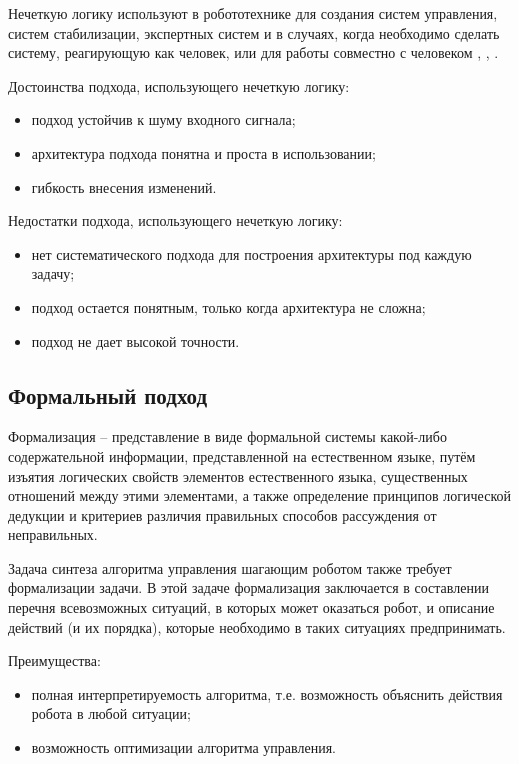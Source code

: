 Нечеткую логику используют в робототехнике для создания систем управления, систем стабилизации, экспертных систем и в случаях, когда необходимо сделать систему, реагирующую как человек, или для работы совместно с человеком \cite{fuzzy1}, \cite{fuzzy2}, \cite{fuzzy3}.

Достоинства подхода, использующего нечеткую логику:
\begin{itemize}
	\item подход устойчив к шуму входного сигнала;
	\item архитектура подхода понятна и проста в использовании;
	\item гибкость внесения изменений.
\end{itemize}

Недостатки подхода, использующего нечеткую логику:
\begin{itemize}
	\item нет систематического подхода для построения архитектуры под каждую задачу;
	\item подход остается понятным, только когда архитектура не сложна;
	\item подход не дает высокой точности.
\end{itemize}


\subsection{Формальный подход}
Формализация – представление в виде формальной системы какой-либо содержательной информации, представленной на естественном языке, путём изъятия логических свойств элементов естественного языка, существенных отношений между этими элементами, а также определение принципов  логической дедукции и критериев различия правильных способов рассуждения от неправильных.

Задача синтеза алгоритма управления шагающим роботом также требует формализации задачи. 
В этой задаче формализация заключается в составлении перечня всевозможных ситуаций, в которых может оказаться робот, и описание действий (и их порядка), которые необходимо в таких ситуациях предпринимать. 

Преимущества:
\begin{itemize}
	\item полная интерпретируемость алгоритма, т.е. возможность объяснить действия робота в любой ситуации;
	\item возможность оптимизации алгоритма управления.
\end{itemize}

